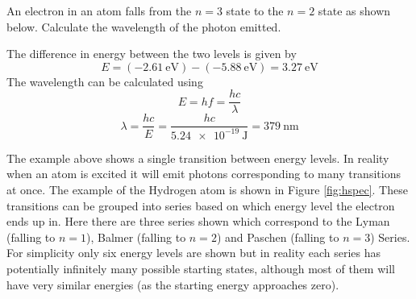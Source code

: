 \documentclass[revision-guide.tex]{subfiles}
\begin{document}
\begin{example}
  An electron in an atom falls from the $n=3$ state to the $n=2$ state as shown below. Calculate the wavelength of the photon emitted.
  \begin{center}
  \end{center}

  \answer
  The difference in energy between the two levels is given by
  \[ E = \left(\SI{-2.61}{\electronvolt}\right) - \left(\SI{-5.88}{\electronvolt}\right) = \SI{3.27}{\electronvolt} \]
  The wavelength can be calculated using
  \[ E = hf = \frac{hc}{\lambda} \]
  \[ \lambda = \frac{hc}{E} = \frac{hc}{\SI{5.24e-19}{\joule}} = \SI{379}{\nano\meter} \]
\end{example}


The example above shows a single transition between energy levels. In reality when an atom is excited it will emit photons corresponding to many transitions at once. The example of the Hydrogen atom is shown in Figure \ref{fig:hspec}. These transitions can be grouped into series based on which energy level the electron ends up in. Here there are three series shown which correspond to the Lyman (falling to $n=1$), Balmer (falling to $n=2$) and Paschen (falling to $n=3$) Series. For simplicity only six energy levels are shown but in reality each series has potentially infinitely many possible starting states, although most of them will have very similar energies (as the starting energy approaches zero).
\end{document}
